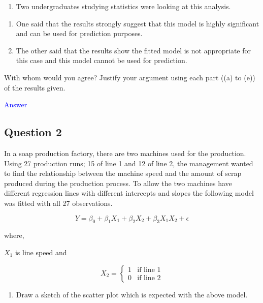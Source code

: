 \documentclass[]{article}
\providecommand{\tightlist}{%
  \setlength{\itemsep}{0pt}\setlength{\parskip}{0pt}}
\begin{document}
\begin{enumerate}
\def\labelenumi{\roman{enumi})}
\setcounter{enumi}{1}
\tightlist
\item
  Two undergraduates studying statistics were looking at this analysis.
\end{enumerate}

\begin{enumerate}
\def\labelenumi{(\Alph{enumi})}
\item
  One said that the results strongly suggest that this model is highly
  significant and can be used for prediction purposes.
\item
  The other said that the results show the fitted model is not
  appropriate for this case and this model cannot be used for
  prediction.
\end{enumerate}

With whom would you agree? Justify your argument using each part ((a) to
(e)) of the results given.

\textcolor{blue}{Answer}

\newpage

\hypertarget{question-2}{%
\subsection{Question 2}\label{question-2}}

In a soap production factory, there are two machines used for the
production. Using 27 production runs; 15 of line 1 and 12 of line 2, the
management wanted to find the relationship between the machine speed and
the amount of scrap produced during the production process. To allow the
two machines have different regression lines with different intercepts
and slopes the following model was fitted with all 27 observations.

\[Y = \beta_0 + \beta_1 X_1 + \beta_2 X_2 + \beta_3 X_1 X_2 + \epsilon\]

where,

\(X_1\) is line speed and

\begin{equation}
  X_{2} =
  \begin{cases}
    1 & \text{if line 1} \\
    0 & \text{if line 2}
  \end{cases}
\end{equation}

\begin{enumerate}
\def\labelenumi{\roman{enumi})}
\tightlist
\item
  Draw a sketch of the scatter plot which is expected with the above
  model.
\end{enumerate}
\end{document}
